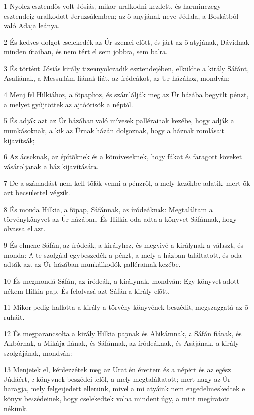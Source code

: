 \par 1 Nyolcz esztendõs volt Jósiás, mikor uralkodni kezdett, és harminczegy esztendeig uralkodott Jeruzsálemben; az õ anyjának neve Jédida, a Boskátból való Adaja leánya.
\par 2 És kedves dolgot cselekedék az Úr szemei elõtt, és járt az õ atyjának, Dávidnak minden útaiban, és nem tért el sem jobbra, sem balra.
\par 3 És történt Jósiás király tizennyolczadik esztendejében, elküldte a király Sáfánt, Asaliának, a Messullám fiának fiát, az íródeákot, az Úr házához, mondván:
\par 4 Menj fel Hilkiához, a fõpaphoz, és számlálják meg az Úr házába begyült pénzt, a melyet gyûjtöttek az ajtóõrizõk a néptõl.
\par 5 És adják azt az Úr házában való mívesek pallérainak kezébe, hogy adják a munkásoknak, a kik az Úrnak házán dolgoznak, hogy a háznak romlásait kijavítsák;
\par 6 Az ácsoknak, az építõknek és a kõmíveseknek, hogy fákat és faragott köveket vásároljanak a ház kijavítására.
\par 7 De a számadást nem kell tõlök venni a pénzrõl, a mely kezökbe adatik, mert õk azt becsülettel végzik.
\par 8 És monda Hilkia, a fõpap, Sáfánnak, az íródeáknak: Megtaláltam a törvénykönyvet az Úr házában. És Hilkia oda adta a könyvet Sáfánnak, hogy olvassa el azt.
\par 9 És elméne Sáfán, az íródeák, a királyhoz, és megvivé a királynak a választ, és monda: A te szolgáid egybeszedék a pénzt, a mely a házban találtatott, és oda adták azt az Úr házában munkálkodók pallérainak kezébe.
\par 10 És megmondá Sáfán, az íródeák, a királynak, mondván: Egy könyvet adott nékem Hilkia pap. És felolvasá azt Sáfán a király elõtt.
\par 11 Mikor pedig hallotta a király a törvény könyvének beszédit, megszaggatá az õ ruháit.
\par 12 És megparancsolta a király Hilkia papnak és Ahikámnak, a Sáfán fiának, és Akbórnak, a Mikája fiának, és Sáfánnak, az íródeáknak, és Asájának, a király szolgájának, mondván:
\par 13 Menjetek el, kérdezzétek meg az Urat én érettem és a népért és az egész Júdáért, e könyvnek beszédei felõl, a mely megtaláltatott; mert nagy az Úr haragja, mely felgerjedett ellenünk, mivel a mi atyáink nem engedelmeskedtek e könyv beszédeinek, hogy cselekedtek volna mindent úgy, a mint megíratott nékünk.
